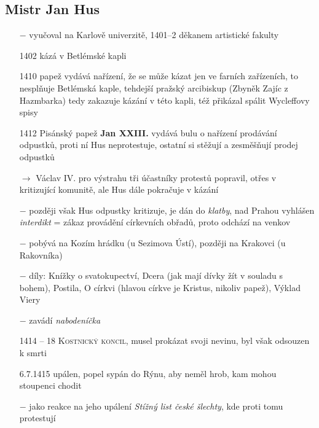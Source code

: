\documentclass{article}
\begin{document}
\subsection*{Mistr Jan Hus}
\begin{itemize}
    \vspace{-0.5em}
    \setlength\itemsep{0.15em}
    \item[$-$] vyučoval na Karlově univerzitě, 1401--2 děkanem artistické fakulty
    \item[1402] kázá v Betlémské kapli
    \item[1410] papež vydává nařízení, že se může kázat jen ve farních zařízeních, to nesplňuje Betlémská kaple, tehdejší pražský arcibiskup (Zbyněk Zajíc z Hazmbarka) tedy zakazuje kázání v této kapli, též přikázal spálit Wycleffovy spisy
    \item[1412] Pisánský papež \textbf{Jan XXIII.} vydává bulu o nařízení prodávání odpustků, proti ní Hus neprotestuje, ostatní si stěžují a zesměšňují prodej odpustků
    \item[$\rightarrow$] Václav IV. pro výstrahu tři účastníky protestů popravil, otřes v kritizující komunitě, ale Hus dále pokračuje v kázání
    \item[$-$] později však Hus odpustky kritizuje, je dán do \textit{klatby}, nad Prahou vyhlášen \textit{interdikt} = zákaz provádění církevních obřadů, proto odchází na venkov
    \item[$-$] pobývá na Kozím hrádku (u Sezimova Ústí), později na Krakovci (u Rakovníka)
    \item[$-$] díly: Knížky o svatokupectví, Dcera (jak mají dívky žít v souladu s bohem), Postila, O církvi (hlavou církve je Kristus, nikoliv papež), Výklad Viery
    \item[$-$] zavádí \textit{nabodeníčka}
    \item[1414 -- 18] \textsc{Kostnický koncil}, musel prokázat svoji nevinu, byl však odsouzen k smrti
    \item[6.7.1415] upálen, popel sypán do Rýnu, aby neměl hrob, kam mohou stoupenci chodit
    \item[$-$] jako reakce na jeho upálení \textit{Stížný list české šlechty}, kde proti tomu protestují     
\end{itemize}
\end{document}
